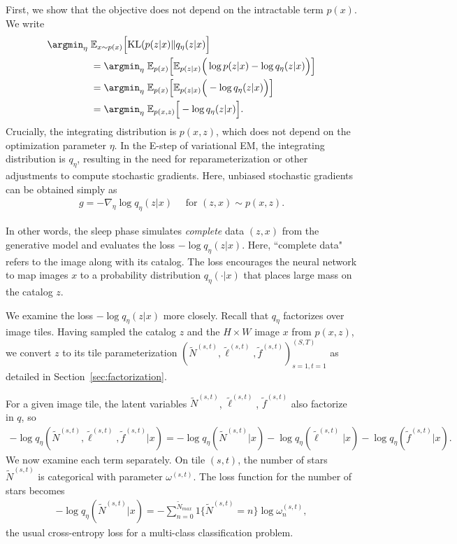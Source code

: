 First, we show that the objective does not depend on the intractable term $p(x)$. 
We write
\begin{align}
 \argmin_{\eta} \; & \mathbb{E}_{x \sim p(x)}\Big[ \mathrm{KL}(p(z | x) \| q_\eta(z | x)\Big] \\
  &=\argmin_{\eta} \; \mathbb E_{p(x)}\Big[\mathbb E_{p(z | x)}\Big(\log p(z | x) - \log q_\eta(z | x) \Big)\Big]\\
&=\argmin_{\eta} \; \mathbb E_{p(x)}\Big[\mathbb E_{p(z | x)}\Big( - \log q_\eta(z | x) \Big)\Big]\\
&=\argmin_{\eta} \; \mathbb E_{p(x, z)}\Big[- \log q_\eta(z | x) \Big]\label{eq:sleep_loss_simple}.
\end{align}
Crucially, the integrating distribution is $p(x,z)$, which does not depend on the optimization parameter $\eta$.
In the E-step of variational EM, the integrating distribution is $q_\eta$, resulting in the need for reparameterization or other adjustments to compute stochastic gradients. 
Here, unbiased stochastic gradients can be obtained simply as 
\begin{align}
    g = -\nabla_\eta \log q_\eta(z | x) \quad \text{ for } (z, x)\sim p(x, z).
\end{align}

In other words, the sleep phase simulates {\itshape complete} data $(z, x)$ from the generative model and evaluates the loss $-\log q_\eta(z | x)$. 
Here, ``complete data" refers to the image along with its catalog. 
The loss encourages the neural network to map images $x$ to a probability distribution $q_{\eta}(\cdot | x)$ that places large mass on the catalog $z$.

We examine the loss $-\log q_\eta(z | x)$ more closely. Recall that $q_\eta$ factorizes over image tiles. Having sampled the catalog $z$ 
and the $H\times W$ image $x$ from $p(x,z)$, we convert $z$ to its tile parameterization $(\tilde N^{(s,t)}, \tilde \ell^{(s,t)}, \tilde f^{(s,t)})_{s=1,t=1}^{(S,T)}$ as detailed in Section~\ref{sec:factorization}.

For a given image tile, the latent variables $\tilde N^{(s,t)}$, $\tilde \ell^{(s,t)}$, $\tilde f^{(s,t)}$ also factorize in $q$, so 
\begin{align}
- \log q_\eta(\tilde N^{(s,t)}, 
                \tilde \ell^{(s,t)}, \tilde f^{(s,t)} | x) 
=   - \log q_\eta(\tilde N^{(s,t)} | x) 
        - \log q_\eta(\tilde \ell^{(s,t)} | x) 
        - \log q_\eta(\tilde f^{(s,t)} | x). 
        \label{eq:sleep_loss_decomp}
\end{align}
We now examine each term separately. On tile $(s,t)$, the number of stars $\tilde N^{(s,t)}$ is categorical with parameter $\omega^{(s,t)}$. The loss function for the number of stars becomes
\begin{align}
    - \log q_\eta(\tilde N^{(s,t)} | x) = -\sum_{n = 0}^{\tilde N_{max}} 1\{\tilde N^{(s,t)} = n\} \log \omega^{(s,t)}_n, 
    \label{eq:cross_entropy_loss}
\end{align}
the usual cross-entropy loss for a multi-class classification problem. 

